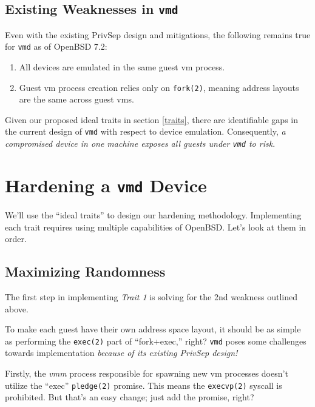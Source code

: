 \documentclass[conference]{IEEEtran}
\begin{document}
\vspace{3mm}
\subsection{Existing Weaknesses in \texttt{vmd}}
Even with the existing PrivSep design and mitigations, the following
remains true for \texttt{vmd} as of OpenBSD 7.2:

\vspace{2mm}
\begin{enumerate}
\item All devices are emulated in the same guest vm process.
\item Guest vm process creation relies only on \texttt{fork(2)},
  meaning address layouts are the same across guest vms.
\end{enumerate}
\vspace{2mm}

Given our proposed ideal traits in section \ref{traits}, there are
identifiable gaps in the current design of \texttt{vmd} with respect
to device emulation. Consequently, \emph{a compromised device in one
machine exposes all guests under \texttt{vmd} to risk}.


\vspace{5mm}
\section{Hardening a \texttt{vmd} Device}
We'll use the ``ideal traits'' to design our hardening
methodology. Implementing each trait requires using multiple
capabilities of OpenBSD. Let's look at them in order.

\vspace{3mm}
\subsection{Maximizing Randomness}
\label{sec:randomness}
The first step in implementing \emph{Trait 1} is solving for the 2nd
weakness outlined above.

To make each guest have their own address space layout, it should be
as simple as performing the \texttt{exec(2)} part of ``fork+exec,''
right? \texttt{vmd} poses some challenges towards implementation
\emph{because of its existing PrivSep design!}

Firstly, the \emph{vmm} process responsible for spawning new vm
processes doesn't utilize the ``exec'' \texttt{pledge(2)}
promise. This means the \texttt{execvp(2)} syscall is prohibited. But
that's an easy change; just add the promise, right?
\end{document}

